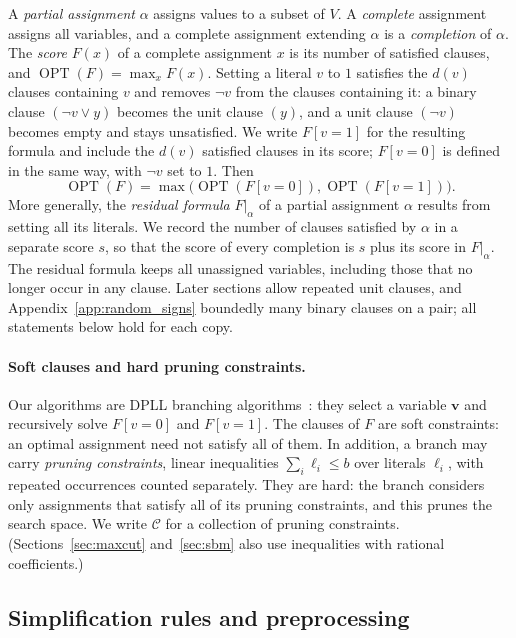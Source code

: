 \documentclass[11pt,a4paper]{article}
\theoremstyle{definition}
\theoremstyle{remark}
\newcommand{\OPT}{\operatorname{OPT}}
\begin{document}
A \emph{partial assignment} $\alpha$ assigns values to a subset of $V$. A
\emph{complete} assignment assigns all variables, and a complete assignment
extending $\alpha$ is a \emph{completion} of $\alpha$. The \emph{score}
$F(x)$ of a complete assignment $x$ is its number of satisfied clauses, and
$\OPT(F)=\max_xF(x)$. Setting a literal $v$ to $1$ satisfies the $d(v)$
clauses containing $v$ and removes $\neg v$ from the clauses containing it:
a binary clause $(\neg v\vee y)$ becomes the unit clause $(y)$, and a unit
clause $(\neg v)$ becomes empty and stays unsatisfied. We write $F[v=1]$
for the resulting formula and include the $d(v)$ satisfied clauses in its
score; $F[v=0]$ is defined in the same way, with $\neg v$ set to $1$. Then
\[
 \OPT(F)=\max\bigl(\OPT(F[v=0]),\OPT(F[v=1])\bigr).
\]
More generally, the \emph{residual formula} $F|_\alpha$ of a partial
assignment $\alpha$ results from setting all its literals. We record the
number of clauses satisfied by $\alpha$ in a separate score $s$, so that the
score of every completion is $s$ plus its score in $F|_\alpha$. The
residual formula keeps all unassigned variables, including those that no
longer occur in any clause. Later sections allow repeated unit clauses, and
Appendix~\ref{app:random_signs} boundedly many binary clauses on a pair;
all statements below hold for each copy.

\paragraph{Soft clauses and hard pruning constraints.}
Our algorithms are DPLL branching
algorithms~\cite{davis1960computing,davis1962machine}: they select a
variable $\mathbf v$ and recursively solve $F[v=0]$ and $F[v=1]$. The
clauses of $F$ are soft constraints: an optimal assignment need not satisfy
all of them. In addition, a branch may carry \emph{pruning constraints},
linear inequalities $\sum_i\ell_i\le b$ over literals $\ell_i$, with
repeated occurrences counted separately. They are hard: the branch
considers only assignments that satisfy all of its pruning constraints,
and this prunes the search space. We write $\mathcal C$ for a collection of
pruning constraints. (Sections~\ref{sec:maxcut} and~\ref{sec:sbm} also use
inequalities with rational coefficients.)

\subsection{Simplification rules and preprocessing}
\end{document}
